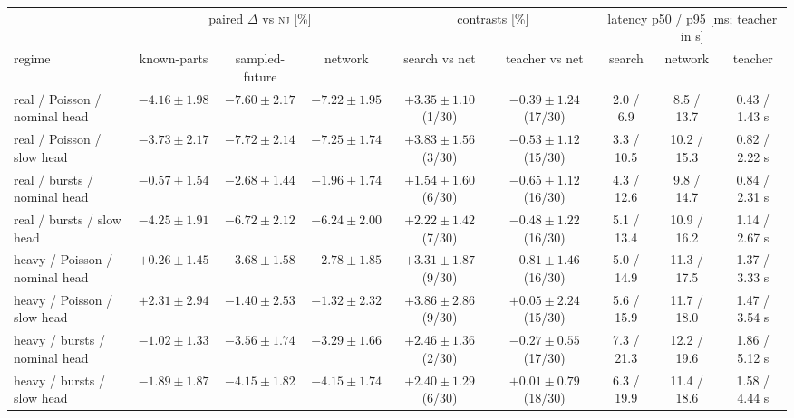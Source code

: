 \begin{tabular}{@{}lccc|cc|ccc@{}}
\toprule
 & \multicolumn{3}{c|}{paired $\Delta$ vs \textsc{nj} [\%]} & \multicolumn{2}{c|}{contrasts [\%]} & \multicolumn{3}{c}{latency p50 / p95 [ms; teacher in s]} \\
regime & known-parts & sampled-future & network & search vs net & teacher vs net & search & network & teacher \\
\midrule
real / Poisson / nominal head & {\boldmath$-4.16 \pm 1.98$} & {\boldmath$-7.60 \pm 2.17$} & {\boldmath$-7.22 \pm 1.95$} & {\boldmath$+3.35 \pm 1.10$} (1/30) & $-0.39 \pm 1.24$ (17/30) & 2.0 / 6.9 & 8.5 / 13.7 & 0.43 / 1.43 s \\
real / Poisson / slow head & {\boldmath$-3.73 \pm 2.17$} & {\boldmath$-7.72 \pm 2.14$} & {\boldmath$-7.25 \pm 1.74$} & {\boldmath$+3.83 \pm 1.56$} (3/30) & $-0.53 \pm 1.12$ (15/30) & 3.3 / 10.5 & 10.2 / 15.3 & 0.82 / 2.22 s \\
real / bursts / nominal head & $-0.57 \pm 1.54$ & {\boldmath$-2.68 \pm 1.44$} & {\boldmath$-1.96 \pm 1.74$} & $+1.54 \pm 1.60$ (6/30) & $-0.65 \pm 1.12$ (16/30) & 4.3 / 12.6 & 9.8 / 14.7 & 0.84 / 2.31 s \\
real / bursts / slow head & {\boldmath$-4.25 \pm 1.91$} & {\boldmath$-6.72 \pm 2.12$} & {\boldmath$-6.24 \pm 2.00$} & {\boldmath$+2.22 \pm 1.42$} (7/30) & $-0.48 \pm 1.22$ (16/30) & 5.1 / 13.4 & 10.9 / 16.2 & 1.14 / 2.67 s \\
heavy / Poisson / nominal head & $+0.26 \pm 1.45$ & {\boldmath$-3.68 \pm 1.58$} & {\boldmath$-2.78 \pm 1.85$} & {\boldmath$+3.31 \pm 1.87$} (9/30) & $-0.81 \pm 1.46$ (16/30) & 5.0 / 14.9 & 11.3 / 17.5 & 1.37 / 3.33 s \\
heavy / Poisson / slow head & $+2.31 \pm 2.94$ & $-1.40 \pm 2.53$ & $-1.32 \pm 2.32$ & {\boldmath$+3.86 \pm 2.86$} (9/30) & $+0.05 \pm 2.24$ (15/30) & 5.6 / 15.9 & 11.7 / 18.0 & 1.47 / 3.54 s \\
heavy / bursts / nominal head & $-1.02 \pm 1.33$ & {\boldmath$-3.56 \pm 1.74$} & {\boldmath$-3.29 \pm 1.66$} & {\boldmath$+2.46 \pm 1.36$} (2/30) & $-0.27 \pm 0.55$ (17/30) & 7.3 / 21.3 & 12.2 / 19.6 & 1.86 / 5.12 s \\
heavy / bursts / slow head & {\boldmath$-1.89 \pm 1.87$} & {\boldmath$-4.15 \pm 1.82$} & {\boldmath$-4.15 \pm 1.74$} & {\boldmath$+2.40 \pm 1.29$} (6/30) & $+0.01 \pm 0.79$ (18/30) & 6.3 / 19.9 & 11.4 / 18.6 & 1.58 / 4.44 s \\
\bottomrule
\end{tabular}
